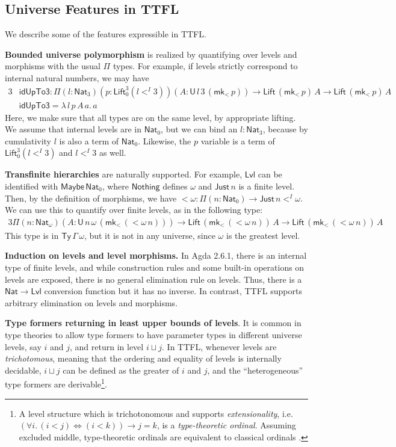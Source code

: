 \documentclass[a4paper,UKenglish,cleveref, autoref, thm-restate]{lipics-v2021}
\theoremstyle{remark}
\theoremstyle{definition}
\newcommand{\Ty}{\mathsf{Ty}}
\newcommand{\U}{\mathsf{U}}
\newcommand{\Nat}{\mathsf{Nat}}
\newcommand{\Lift}{\mathsf{Lift}}
\newcommand{\Lvl}{\mathsf{Lvl}}
\renewcommand{\U}{\mathsf{U}}
\newcommand{\msf}[1]{\mathsf{#1}}
\newcommand{\mkMor}{\msf{mk}\!_<}
\begin{document}
\subsection{Universe Features in TTFL}

We describe some of the features expressible in TTFL.

\textbf{Bounded universe polymorphism} is realized by quantifying over levels
and morphisms with the usual $\Pi$ types. For example, if levels strictly
correspond to internal natural numbers, we may have
\begin{alignat*}{3}
  &\msf{idUpTo3} : \Pi(l : \Nat_3)(p : \Lift_0^3(l <^I 3))(A : \U\,l\,3\,(\mkMor\,p)) \to \Lift\,(\mkMor\,p)\,A \to \Lift\,(\mkMor\,p)\,A\\
  &\msf{idUpTo3} = \lambda\,l\,p\,A\,a.\,a
\end{alignat*}
Here, we make sure that all types are on the same level, by appropriate
lifting. We assume that internal levels are in $\Nat_0$, but we can bind an $l :
\Nat_3$, because by cumulativity $l$ is also a term of $\Nat_0$. Likewise, the
$p$ variable is a term of $\Lift_0^3(l <^I 3)$ and $l <^I 3$ as well.

\textbf{Transfinite hierarchies} are naturally supported. For example, $\Lvl$
can be identified with $\msf{Maybe}\,\Nat_0$, where $\msf{Nothing}$ defines
$\omega$ and $\msf{Just}\,n$ is a finite level. Then, by the definition of
morphisms, we have $<\!\omega : \Pi(n : \Nat_0) \to \msf{Just}\,n <^I \omega$.
We can use this to quantify over finite levels, as in the following type:
\begin{alignat*}{3}
  \Pi(n : \Nat_{\omega})(A : \U\,n\,\omega\,(\mkMor\,(<\!\omega\,n))) \to \Lift\,(\mkMor\,(<\!\omega\,n))\,A \to \Lift\,(\mkMor\,(<\!\omega\,n))\,A
\end{alignat*}
This type is in $\Ty\,\Gamma\,\omega$, but it is not in any universe, since
$\omega$ is the greatest level.

\textbf{Induction on levels and level morphisms.} In Agda 2.6.1, there is an
internal type of finite levels, and while construction rules and some built-in
operations on levels are exposed, there is no general elimination rule on
levels. Thus, there is a $\Nat \to \Lvl$ conversion function but it has no
inverse. In contrast, TTFL supports arbitrary elimination on levels and
morphisms.

\textbf{Type formers returning in least upper bounds of levels}. It is common in
type theories to allow type formers to have parameter types in different
universe levels, say $i$ and $j$, and return in level $i \sqcup j$. In TTFL,
whenever levels are \emph{trichotomous}, meaning that the ordering and equality
of levels is internally decidable, $i \sqcup j$ can be defined as the greater of
$i$ and $j$, and the ``heterogeneous'' type formers are derivable\footnote{A
level structure which is trichotonomous and supports \emph{extensionality},
i.e.\ $(\forall i.\, (i < j) \iff (i < k)) \to j = k$, is a
\emph{type-theoretic ordinal}. Assuming excluded middle, type-theoretic
ordinals are equivalent to classical ordinals \cite[Section 10.3]{hottbook}.}.
\end{document}
